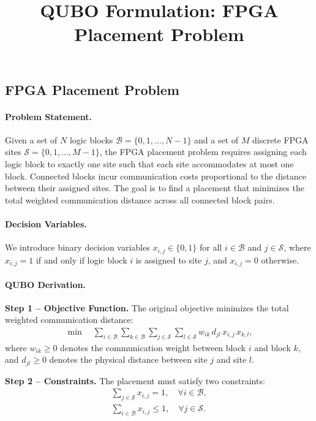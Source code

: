 \documentclass[12pt]{article}
\title{QUBO Formulation: FPGA Placement Problem}
\date{}
\begin{document}
\maketitle

\subsection*{FPGA Placement Problem}

\paragraph{Problem Statement.}
Given a set of $N$ logic blocks $\mathcal{B} = \{0, 1, \dots, N-1\}$ and a set of $M$ discrete FPGA sites $\mathcal{S} = \{0, 1, \dots, M-1\}$, the FPGA placement problem requires assigning each logic block to exactly one site such that each site accommodates at most one block. Connected blocks incur communication costs proportional to the distance between their assigned sites. The goal is to find a placement that minimizes the total weighted communication distance across all connected block pairs.

\paragraph{Decision Variables.}
We introduce binary decision variables $x_{i,j} \in \{0, 1\}$ for all $i \in \mathcal{B}$ and $j \in \mathcal{S}$, where $x_{i,j} = 1$ if and only if logic block $i$ is assigned to site $j$, and $x_{i,j} = 0$ otherwise.

\paragraph{QUBO Derivation.}
\textbf{Step 1 -- Objective Function.} The original objective minimizes the total weighted communication distance:
\begin{align}
    \min \quad \sum_{i \in \mathcal{B}} \sum_{k \in \mathcal{B}} \sum_{j \in \mathcal{S}} \sum_{l \in \mathcal{S}} w_{ik} \, d_{jl} \, x_{i,j} \, x_{k,l},
\end{align}
where $w_{ik} \ge 0$ denotes the communication weight between block $i$ and block $k$, and $d_{jl} \ge 0$ denotes the physical distance between site $j$ and site $l$.

\textbf{Step 2 -- Constraints.} The placement must satisfy two constraints:
\begin{align}
    \sum_{j \in \mathcal{S}} x_{i,j} = 1, \quad \forall i \in \mathcal{B}, \tag{C1} \\
    \sum_{i \in \mathcal{B}} x_{i,j} \le 1, \quad \forall j \in \mathcal{S}. \tag{C2}
\end{align}
\end{document}
